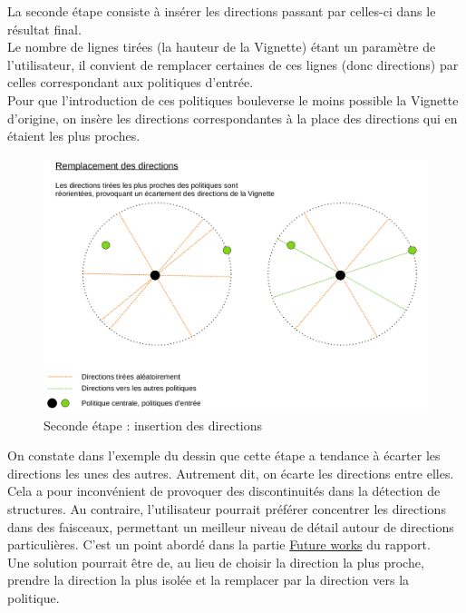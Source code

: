 \documentclass[12pt]{article}
\begin{document}
La seconde étape consiste à insérer les directions passant par celles-ci dans le résultat final. \\

Le nombre de lignes tirées (la hauteur de la Vignette) étant un paramètre de l'utilisateur, il convient de remplacer certaines de ces lignes (donc directions) par celles correspondant aux politiques d'entrée. \\

Pour que l'introduction de ces politiques bouleverse le moins possible la Vignette d'origine, on insère les directions correspondantes à la place des directions qui en étaient les plus proches. \\

\begin{figure}[htp]
    \centering
    \includegraphics[width=15cm]{Images/vignette_portee2}
    \caption{Seconde étape : insertion des directions}
    \label{fig:vignettePortee}
\end{figure}

On constate dans l'exemple du dessin que cette étape a tendance à écarter les directions les unes des autres. Autrement dit, on écarte les directions entre elles. \\

Cela a pour inconvénient de provoquer des discontinuités dans la détection de structures. Au contraire, l'utilisateur pourrait préférer concentrer les directions dans des faisceaux, permettant un meilleur niveau de détail autour de directions particulières. C'est un point abordé dans la partie \hyperref[sec:future]{Future works} du rapport. \\

Une solution pourrait être de, au lieu de choisir la direction la plus proche, prendre la direction la plus isolée et la remplacer par la direction vers la politique. \\
\end{document}
